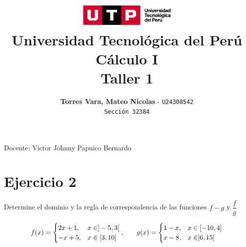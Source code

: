 \documentclass[12pt]{article}
\title{
  \vspace{2cm}
  \pagenumbering{gobble}
  \includegraphics[width=5cm]{./assets/logo-utp.png} \\
  \vspace{1cm}
  \textbf{Universidad Tecnológica del Perú} \\
  \vspace{2cm}
  \textbf{Cálculo I} \\
  \vspace{1cm}
  \large \textbf{Taller 1}
}
\author{
  \textbf{Torres Vara, Mateo Nicolas} - \texttt{U24308542} \\
  \texttt{Sección 32384}
}
\begin{document}
\maketitle
\begin{center}

  Docente: Victor Johnny Papuico Bernardo

\end{center}

%
%

\newpage
\section*{Ejercicio 2}
Determine el dominio y la regla de correspondencia de las funciones $f - g$ y $\dfrac{f}{g}$

\vspace{-0.5cm}

\begin{center}
\[
\begin{array}{c@{\qquad}c}
  f(x) =
  \begin{cases}
    2x + 1, & x \in ]-5,3[ \\
    -x + 5, & x \in [3,10[
  \end{cases},  
  &
  g(x) =
  \begin{cases}
    1-x, & x \in [-10, 4] \\
    x-8, & x \in ]6, 15[
\end{cases}
\end{array}
\]
\end{center}

\vspace{0.5cm}
\end{document}
